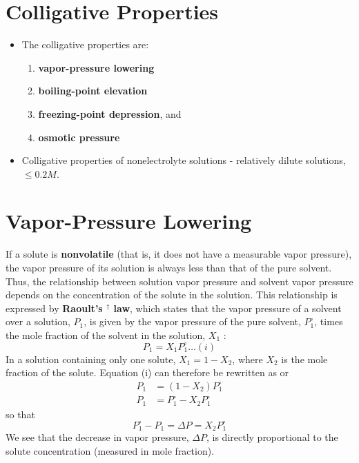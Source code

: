 \documentclass[a4paper,12pt,twocolumn]{article}
\begin{document}
\section{Colligative Properties}
\begin{itemize}
\item The colligative properties are:
    \begin{enumerate}
        \item \textbf{vapor-pressure lowering}
        \item \textbf{boiling-point elevation}
        \item \textbf{freezing-point depression}, and
        \item \textbf{osmotic pressure}
    \end{enumerate}
\item Colligative properties of nonelectrolyte solutions - relatively dilute solutions, $\le 0.2 M$.
\end{itemize}

\section{Vapor-Pressure Lowering}
If a solute is \textbf{nonvolatile} (that is, it does not have a measurable vapor pressure), the vapor pressure of its solution is always less than that of the pure solvent. Thus, the relationship between solution vapor pressure and solvent vapor pressure depends on the concentration of the solute in the solution. This relationship is expressed by \textbf{Raoult's ${ }^{\dagger}$ law}, which states that the vapor pressure of a solvent over a solution, $P_1$, is given by the vapor pressure of the pure solvent, $P_1^{\circ}$, times the mole fraction of the solvent in the solution, $X_1$ :
$$
P_1=X_1 P_1^{\circ} \ldots (i)
$$
In a solution containing only one solute, $X_1=1-X_2$, where $X_2$ is the mole fraction of the solute. Equation (i) can therefore be rewritten as
or
$$
\begin{aligned}
P_1 &=\left(1-X_2\right) P_1^{\circ} \\
P_1 &=P_1^{\circ}-X_2 P_1^{\circ}
\end{aligned}
$$
so that
$$
P_1^{\circ}-P_1=\Delta P=X_2 P_1^{\circ}
$$
We see that the decrease in vapor pressure, $\Delta P$, is directly proportional to the solute concentration (measured in mole fraction).\\
\end{document}
